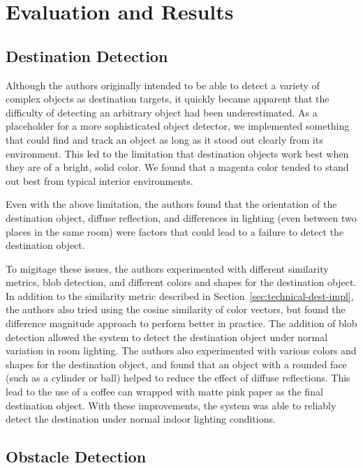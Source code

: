 \section{Evaluation and Results}
\label{sec:eval}

\subsection{Destination Detection}
\label{sec:eval-dest}

Although the authors originally intended to be able to detect a variety
of complex objects as destination targets, it quickly became apparent that
the difficulty of detecting an arbitrary object had been underestimated.
As a placeholder for a more sophisticated object detector, we implemented
something that could find and track an object as long as it stood out
clearly from its environment. This led to the limitation that
destination objects work best when they are of a bright, solid color. We found
that a magenta color tended to stand out best from typical interior
environments. 

Even with the above limitation, the authors found that the orientation
of the destination object, diffuse reflection, and differences in lighting
(even between two places in the same room) were factors that could lead
to a failure to detect the destination object. 

To migitage these issues, the authors experimented with different similarity
metrics, blob detection, and different colors and shapes for the destination
object. In addition to the similarity metric described in 
Section~\ref{sec:technical-dest-impl}, the authors also tried using
the cosine similarity of color vectors, but found the difference magnitude
approach to perform better in practice. The addition of blob detection
allowed the system to detect the destination object under normal variation
in room lighting. The authors also experimented with various colors and
shapes for the destination object, and found that an object with a rounded
face (such as a cylinder or ball) helped to reduce the effect of diffuse
reflections. This lead to the use of a coffee can wrapped with matte pink paper
as the final destination object. With these improvements, the system was able 
to reliably detect the destination under normal indoor lighting conditions.

\subsection{Obstacle Detection}
\label{sec:eval-obs}

